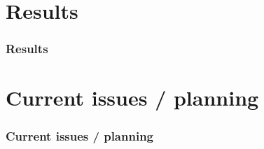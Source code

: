 \documentclass[handout]{beamer}
\begin{document}
\section{Results}
\begin{frame}
    \frametitle{Results}
\end{frame}

\section{Current issues / planning}
\begin{frame}
    \frametitle{Current issues / planning}
\end{frame}

\end{document}
